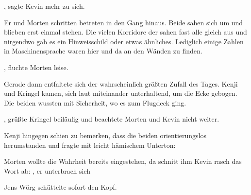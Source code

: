 \par

, sagte Kevin mehr zu sich.

\par

Er und Morten schritten betreten in den Gang hinaus. Beide sahen sich um und blieben erst einmal stehen. Die vielen Korridore der  sahen fast alle gleich aus und nirgendwo gab es ein Hinweisschild oder etwas ähnliches. Lediglich einige Zahlen in Maschinensprache waren hier und da an den Wänden zu finden.

\par

, fluchte Morten leise.

\par

Gerade dann entfaltete sich der wahrscheinlich größten Zufall des Tages. Kenji und Kringel kamen, sich laut miteinander unterhaltend, um die Ecke gebogen. Die beiden wussten mit Sicherheit, wo es zum Flugdeck ging.

\par

, grüßte Kringel beiläufig und beachtete Morten und Kevin nicht weiter.

\par

Kenji hingegen schien zu bemerken, dass die beiden orientierungslos herumstanden und fragte mit leicht hämischem Unterton: 

\par

Morten wollte die Wahrheit bereits eingestehen, da schnitt ihm Kevin rasch das Wort ab: , er unterbrach sich 

\par

Jens Wörg schüttelte sofort den Kopf. 

\par

